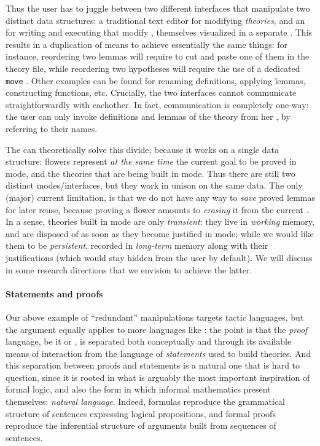 \begin{scope}
Thus the user has to juggle between two different interfaces that manipulate two
distinct data structures: a traditional text editor for modifying
\emph{theories}, and an  for writing and executing 
that modify \emph{}, themselves visualized in a separate . This results in a duplication of means to achieve essentially the same
things: for instance, reordering two lemmas will require to cut and paste one of
them in the theory file, while reordering two hypotheses will require the use of
a dedicated \texttt{move} . Other examples can be found for renaming
definitions, applying lemmas, constructing functions, etc. Crucially, the two
interfaces cannot communicate straightforwardly with eachother. In fact,
communication is completely one-way: the user can only invoke definitions and
lemmas of the theory from her , by referring to their names.

The  can theoretically solve this divide, because it works on a
single data structure: flowers represent \emph{at the same time} the current
goal to be proved in \Proof mode, and the theories that are being built in \Edit
mode. Thus there are still two distinct modes/interfaces, but they work in
unison on the same data. The only (major) current limitation, is that we do not
have any way to \emph{save} proved lemmas for later reuse, because proving a
flower amounts to \emph{erasing} it from the current . In a sense, theories
built in \Edit mode are only \emph{transient}: they live in \emph{working}
memory, and are disposed of as soon as they become justified in \Proof mode;
while we would like them to be \emph{persistent}, recorded in \emph{long-term}
memory along with their justifications (which would stay hidden from the user by
default). We will discuss in  some research directions that
we envision to achieve the latter. 

\paragraph{Statements and proofs}

Our above example of ``redundant'' manipulations targets  tactic
languages, but the argument equally applies to more  languages
like : the point is that the \emph{proof} language, be it  or
, is separated both conceptually and through its available means
of interaction from the language of \emph{statements} used to build theories.
And this separation between proofs and statements is a natural one that is hard
to question, since it is rooted in what is arguably the most important
inspiration of formal logic, and also the form in which informal mathematics
present themselves: \emph{natural language}. Indeed,  formulas
reproduce the grammatical structure of sentences expressing logical
propositions, and formal proofs reproduce the inferential structure of arguments
built from sequences of sentences.


\end{scope}
